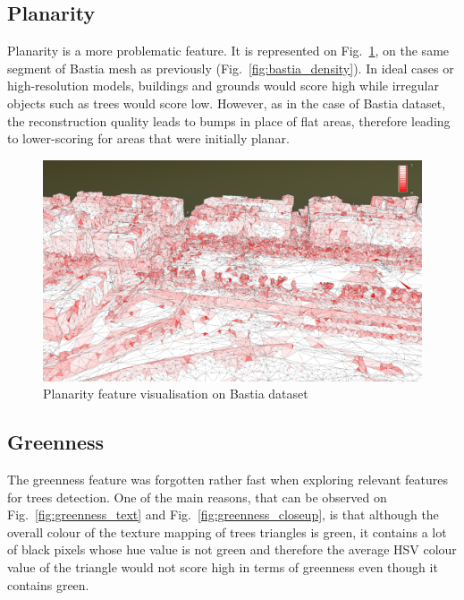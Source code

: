 \documentclass{kththesis}
\begin{document}
\subsection{Planarity}
Planarity is a more problematic feature. It is represented on Fig.~\ref{fig:bastia_planarity}, on the same segment of Bastia mesh as previously (Fig.~\ref{fig:bastia_density}). In ideal cases or high-resolution models, buildings and grounds would score high while irregular objects such as trees would score low. However, as in the case of Bastia dataset, the reconstruction quality leads to bumps in place of flat areas, therefore leading to lower-scoring for areas that were initially planar. 
\begin{figure}[H]
    \centering
    \includegraphics[width=\textwidth]{images/features/planarity_bastia.png}
    \caption{Planarity feature visualisation on Bastia dataset}
    \label{fig:bastia_planarity}
\end{figure}
\subsection{Greenness}
The greenness feature was forgotten rather fast when exploring relevant features for trees detection. One of the main reasons, that can be observed on Fig.~\ref{fig:greenness_text} and Fig.~\ref{fig:greenness_closeup}, is that although the overall colour of the texture mapping of trees triangles is green, it contains a lot of black pixels whose hue value is not green and therefore the average HSV colour value of the triangle would not score high in terms of greenness even though it contains green. \\
\end{document}
